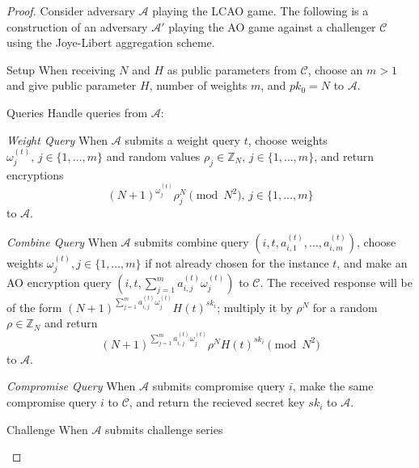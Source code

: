 \documentclass[10pt,letterpaper,oneside,twocolumn,journal]{IEEEtran}
\theoremstyle{definition}
\theoremstyle{definition}
\theoremstyle{remark}
\begin{document}
\begin{proof}
    Consider adversary $\mathcal{A}$ playing the LCAO game. The following is a construction of an adversary $\mathcal{A}'$ playing the AO game \cite{shiPrivacyPreservingAggregationTimeSeries2011} against a challenger $\mathcal{C}$ using the Joye-Libert aggregation scheme.
    \begin{LaTeXdescription}
        \item[Setup] When receiving $N$ and $H$ as public parameters from $\mathcal{C}$, choose an $m>1$ and give public parameter $H$, number of weights $m$, and $pk_0=N$ to $\mathcal{A}$.
        \item[Queries] Handle queries from $\mathcal{A}$:
        \begin{LaTeXdescription}
            \item[\textit{Weight Query}] When $\mathcal{A}$ submits a weight query $t$, choose weights $\omega^{(t)}_j,\,j\in\{1,\dots,m\}$ and random values $\rho_j \in \mathbb{Z}_N,\,j\in\{1,\dots,m\}$, and return encryptions 
            \begin{equation*}
                (N+1)^{\omega^{(t)}_{j}}\rho_j^N\pmod{N^2},\,j\in\{1,\dots,m\}
            \end{equation*}
            to $\mathcal{A}$.
            \item[\textit{Combine Query}] When $\mathcal{A}$ submits combine query $(i, t, a^{(t)}_{i,1},\dots,a^{(t)}_{i,m})$, choose weights $\omega^{(t)}_j,j\in\{1,\dots,m\}$ if not already chosen for the instance $t$, and make an AO encryption query $(i, t, \sum^m_{j=1}a^{(t)}_{i,j}\omega^{(t)}_j)$ to $\mathcal{C}$. The received response will be of the form $(N+1)^{\sum^m_{j=1}a^{(t)}_{i,j}\omega^{(t)}_j}H(t)^{sk_i}$; multiply it by $\rho^N$ for a random $\rho \in \mathbb{Z}_N$ and return 
            \begin{equation*}
                (N+1)^{\sum^m_{j=1}a^{(t)}_{i,j}\omega^{(t)}_j}\rho^N H(t)^{sk_i} \pmod{N^2}
            \end{equation*}
            to $\mathcal{A}$.
            \item[\textit{Compromise Query}] When $\mathcal{A}$ submits compromise query $i$, make the same compromise query $i$ to $\mathcal{C}$, and return the recieved secret key $sk_i$ to $\mathcal{A}$.
        \end{LaTeXdescription}
        \item[Challenge] When $\mathcal{A}$ submits challenge series
        \begin{equation*}

\end{equation*}
\end{LaTeXdescription}
\end{proof}
\end{document}
